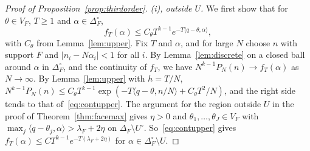 \begin{proof}[Proof of Proposition~\ref{prop:thirdorder}]
\emph{(i), outside $U$.} We first show that for $\theta\in V_F$, $T\ge1$ and
$\alpha\in\Delta_F^\circ$,
\begin{equation}\label{eq:contupper}
f_T(\alpha)\le C_\theta T^{k-1}e^{-T\langle q-\theta,\alpha\rangle},
\end{equation}
with $C_\theta$ from Lemma~\ref{lem:upper}. Fix $T$ and $\alpha$, and for large
$N$ choose $n$ with support $F$ and $|n_i-N\alpha_i|<1$ for all $i$. By
Lemma~\ref{lem:discrete} on a closed ball around $\alpha$ in
$\Delta_F^\circ$, and the continuity of $f_T$, we have
$N^{k-1}P_N(n)\to f_T(\alpha)$ as $N\to\infty$. By Lemma~\ref{lem:upper} with
$h=T/N$,
$N^{k-1}P_N(n)\le C_\theta T^{k-1}\exp(-T\langle q-\theta,n/N\rangle
+C_\theta T^2/N)$, and the right side tends to that of~\eqref{eq:contupper}.
The argument for the region outside $U$ in the proof of
Theorem~\ref{thm:facemax} gives $\eta>0$ and
$\theta_1,\dots,\theta_J\in V_F$ with
$\max_j\langle q-\theta_j,\alpha\rangle>\lambda_F+2\eta$ on
$\Delta_F\setminus U^\circ$. So~\eqref{eq:contupper} gives
$f_T(\alpha)\le CT^{k-1}e^{-T(\lambda_F+2\eta)}$ for
$\alpha\in\Delta_F^\circ\setminus U$.


\end{proof}

